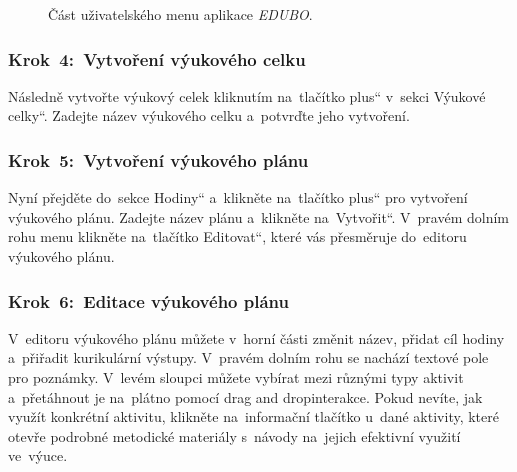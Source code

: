 \documentclass[male,czech,api_bc]{kitheses}
\begin{document}
\begin{figure}[H]
	\centering
	\caption{Část uživatelského menu aplikace \textit{EDUBO}.}
	\label{fig:manual-1}
\end{figure}

\subsubsection{Krok~4:~Vytvoření výukového celku}
Následně vytvořte výukový celek kliknutím na~tlačítko \quotedblbase plus`` v~sekci \quotedblbase Výukové celky``. Zadejte název výukového celku a~potvrďte jeho vytvoření.

\subsubsection{Krok~5:~Vytvoření výukového plánu}
Nyní přejděte do~sekce \quotedblbase Hodiny`` a~klikněte na~tlačítko \quotedblbase plus`` pro vytvoření výukového plánu. Zadejte název plánu a~klikněte na~\quotedblbase Vytvořit``. V~pravém dolním rohu menu klikněte na~tlačítko \quotedblbase Editovat``, které vás přesměruje do~editoru výukového plánu.

\subsubsection{Krok~6:~Editace výukového plánu}
V~editoru výukového plánu můžete v~horní části změnit název, přidat cíl hodiny a~přiřadit kurikulární výstupy. V~pravém dolním rohu se nachází textové pole pro poznámky. V~levém sloupci můžete vybírat mezi různými typy aktivit a~přetáhnout je na~plátno pomocí drag and drop\break interakce. Pokud nevíte, jak využít konkrétní aktivitu, klikněte na~informační tlačítko u~dané aktivity, které otevře podrobné metodické materiály s~návody na~jejich efektivní využití ve~výuce.
\end{document}
